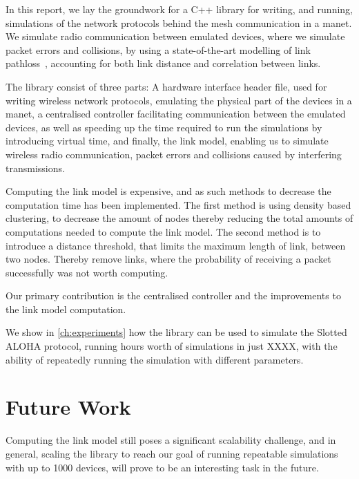 In this report, we lay the groundwork for a C++ library for writing, and running, simulations of the network protocols behind the mesh communication in a \gls{manet}. We simulate radio communication between emulated devices, where we simulate packet errors and collisions, by using a state-of-the-art modelling of link \gls{pathloss}~\cite{paper:linkmodel}, accounting for both link distance and correlation between links. \smallbreak

The library consist of three parts: A hardware interface header file, used for writing wireless network protocols, emulating the physical part of the devices in a \gls{manet}, a centralised controller facilitating communication between the emulated devices, as well as speeding up the time required to run the simulations by introducing virtual time, and finally, the link model, enabling us to simulate wireless radio communication, packet errors and collisions caused by interfering transmissions.\smallbreak

Computing the link model is expensive, and as such methods to decrease the computation time has been implemented. The first method is using density based clustering, to decrease the amount of nodes thereby reducing the total amounts of computations needed to compute the link model. The second method is to introduce a distance threshold, that limits the maximum length of link, between two nodes. Thereby remove links, where the probability of receiving a packet successfully was not worth computing.\smallbreak

Our primary contribution is the centralised controller and the improvements to the link model computation.

We show in \autoref{ch:experiments} how the library can be used to simulate the Slotted ALOHA protocol, running hours worth of simulations in just XXXX, with the ability of repeatedly running the simulation with different parameters.\smallbreak


\section{Future Work}\label{sec:futurework}
Computing the link model still poses a significant scalability challenge, and in general, scaling the library to reach our goal of running repeatable simulations with up to 1000 devices, will prove to be an interesting task in the future.\smallbreak

